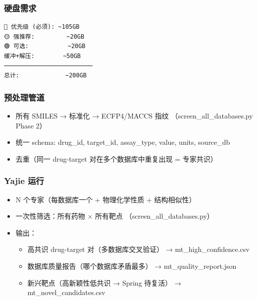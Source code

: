 \documentclass[
  12pt,
]{ctexart}
\providecommand{\tightlist}{%
  \setlength{\itemsep}{0pt}\setlength{\parskip}{0pt}}
\begin{document}
\subsubsection{硬盘需求}\label{ux786cux76d8ux9700ux6c42}

\begin{verbatim}
🔴 优先级 (必须): ~105GB
🟡 强推荐:         ~20GB  
🟢 可选:           ~20GB
缓冲+解压:        ~50GB
─────────────────────────
总计:             ~200GB
\end{verbatim}

\subsubsection{预处理管道}\label{ux9884ux5904ux7406ux7ba1ux9053}

\begin{itemize}
\tightlist
\item[$\boxtimes$]
  所有 SMILES → 标准化 → ECFP4/MACCS 指纹 （screen\_all\_databases.py
  Phase 2）
\item[$\boxtimes$]
  统一 schema: drug\_id, target\_id, assay\_type, value, units,
  source\_db
\item[$\boxtimes$]
  去重（同一 drug-target 对在多个数据库中重复出现 = 专家共识）
\end{itemize}

\subsubsection{Yajie 运行}\label{yajie-ux8fd0ux884c}

\begin{itemize}
\tightlist
\item[$\boxtimes$]
  N 个专家（每数据库一个 + 物理化学性质 + 结构相似性）
\item[$\boxtimes$]
  一次性筛选：所有药物 × 所有靶点 （screen\_all\_databases.py）
\item[$\boxtimes$]
  输出：

  \begin{itemize}
  \tightlist
  \item
    高共识 drug-target 对（多数据库交叉验证） → mt\_high\_confidence.csv
  \item
    数据库质量报告（哪个数据库矛盾最多） → mt\_quality\_report.json
  \item
    新兴靶点（高新颖性低共识 → Spring 待复活） →
    mt\_novel\_candidates.csv
  \end{itemize}
\end{itemize}
\end{document}
